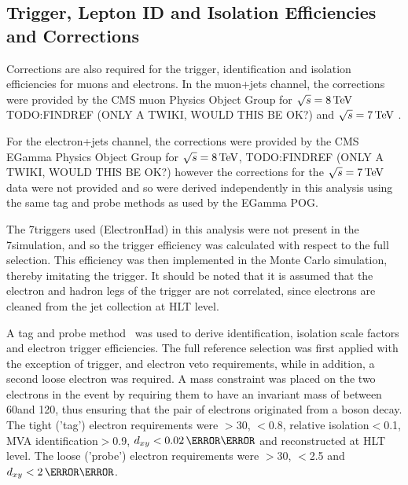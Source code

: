 \subsection{Trigger, Lepton ID and Isolation Efficiencies and Corrections}
\label{ss:trigger_ID_isolation_corrections}
Corrections are also required for the trigger, identification and isolation efficiencies for muons and
electrons. In the muon+jets channel, the corrections were provided by the CMS muon Physics Object Group
for $\sqrt{s}=8\,\text{Te\hspace{-.08em}V}$ TODO:FINDREF (ONLY A TWIKI, WOULD THIS BE OK?) %
and $\sqrt{s}=7\,\text{Te\hspace{-.08em}V}$ \cite{CMS-PAS-SMP-13-013}.

For the electron+jets channel, the corrections were provided by the CMS EGamma Physics Object Group for
$\sqrt{s}=8\,\text{Te\hspace{-.08em}V}$, TODO:FINDREF (ONLY A TWIKI, WOULD THIS BE OK?) %
however the corrections for the $\sqrt{s}=7\,\text{Te\hspace{-.08em}V}$ data were not provided and so were derived independently in
this analysis using the same tag and probe methods as used by the EGamma POG.

The 7\TeV triggers used (ElectronHad) in this analysis were not present in the 7\TeV simulation,
and so the trigger efficiency was calculated with respect to the full selection. This efficiency was then
implemented in the Monte Carlo simulation, thereby imitating the trigger. It should be noted that it is
assumed that the electron and hadron legs of the trigger are not correlated, since electrons are cleaned from
the jet collection at HLT level.

A tag and probe method~\cite{CMS:2011aa} was used to derive identification, isolation scale factors and
electron trigger efficiencies. The full reference selection was first applied with the exception of trigger,
\btagging and electron veto requirements, while in addition, a second loose electron was required. A \Z mass
constraint was placed on the two electrons in the event by requiring them to have an invariant mass of between
60\GeV and 120\GeV, thus ensuring that the pair of electrons originated from a \Z boson decay. The tight
('tag') electron requirements were \pt$>$30\GeV, \abseta$<$0.8, relative isolation$<$0.1, MVA
identification$>$0.9, $d_{xy}<0.02\cm$ and reconstructed at HLT level. The loose ('probe') electron
requirements were \pt$>$30\GeV, \abseta$<$2.5 and $d_{xy}<2\cm$.

